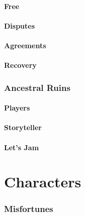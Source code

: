 \documentclass[11pt]{article}
\begin{document}
\begin{multicols}{2}
\lipsum[1]

\subsection{Free}

\lipsum[1]

\subsection{Disputes}

\lipsum[1]

\subsection{Agreements}

\lipsum[1]

\subsection{Recovery}

\lipsum[1]

\section{Ancestral Ruins}

\lipsum[1]

\subsection{Players}

\lipsum[1]

\subsection{Storyteller}

\lipsum[1]

\subsection{Let's Jam}

\lipsum[1]

\part{Characters}

\lipsum[1]

\section{Misfortunes}


\end{multicols}
\end{document}
